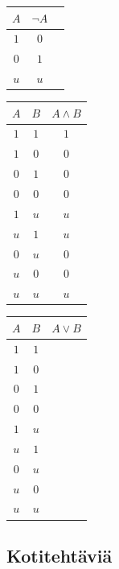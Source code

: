 \begin{enumerate}
\begin{center}
\begin{tabular}{|c|c|c|}\hline
$A$ & $\lnot A$ \\ \hline
$1$ & $0$ \\
$0$ & $1$ \\
$u$ & $u$ \\ \hline
\end{tabular}
\qquad
\begin{tabular}{|c|c|c|}\hline
$A$ & $B$ & $A\land B$\\ \hline
$1$ & $1$ & $1$\\
$1$ & $0$ & $0$\\
$0$ & $1$ & $0$\\
$0$ & $0$ & $0$\\
$1$ & $u$ & $u$\\
$u$ & $1$ & $u$\\
$0$ & $u$ & $0$\\
$u$ & $0$ & $0$\\
$u$ & $u$ & $u$\\ \hline
\end{tabular}
\qquad
\begin{tabular}{|c|c|c|}\hline
$A$ & $B$ & $A\lor B$\\ \hline
$1$ & $1$ & \\
$1$ & $0$ & \\
$0$ & $1$ & \\
$0$ & $0$ & \\
$1$ & $u$ & \\
$u$ & $1$ & \\
$0$ & $u$ & \\
$u$ & $0$ & \\
$u$ & $u$ & \\ \hline
\end{tabular}
\end{center}

\end{enumerate}

\subsection*{Kotitehtäviä}

